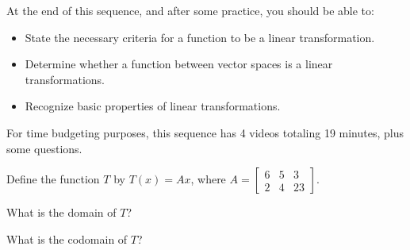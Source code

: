 




At the end of this sequence, and after some practice, you should be able to:

\begin{itemize}
\item State the necessary criteria for a function to be a linear transformation.  
\item Determine whether a function between vector spaces is a linear transformations. 
\item Recognize basic properties of linear transformations.
\end{itemize}

For time budgeting purposes, this sequence has 4 videos totaling 19 minutes, 
plus some questions.  


\endedxtext

\endedxvertical







Define the function $T$ by $T(x) = Ax$, where $A = \left[ \begin{array}{ccc}
6 & 5 & 3 \\
2 & 4 &  23 
\end{array} \right].$

What is the domain of $T$?


What is the codomain of $T$?



\endedxproblem



\endedxvertical






